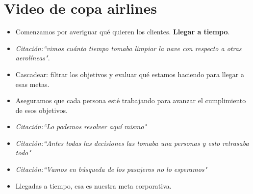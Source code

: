 \section{Video de copa airlines}
\begin{itemize}
    \item Comenzamos por averiguar qué quieren los clientes. \textbf{Llegar a tiempo}.
    \item \emph{Citación:``vimos cuánto tiempo tomaba limpiar la nave con respecto a otras aerolíneas"}.
    \item Cascadear: filtrar los objetivos y evaluar qué estamos haciendo para llegar a esas metas.
    \item Aseguramos que cada persona esté trabajando para avanzar el cumplimiento de esos objetivos.
    \item \emph{Citación:``Lo podemos resolver aquí mismo"}
    \item \emph{Citación:``Antes todas las decisiones las tomaba una personas y esto retrasaba todo"}
    \item \emph{Citación:``Vamos en búsqueda de los pasajeros no lo esperamos"}
    \item Llegadas a tiempo, esa es nuestra meta corporativa.
\end{itemize}


